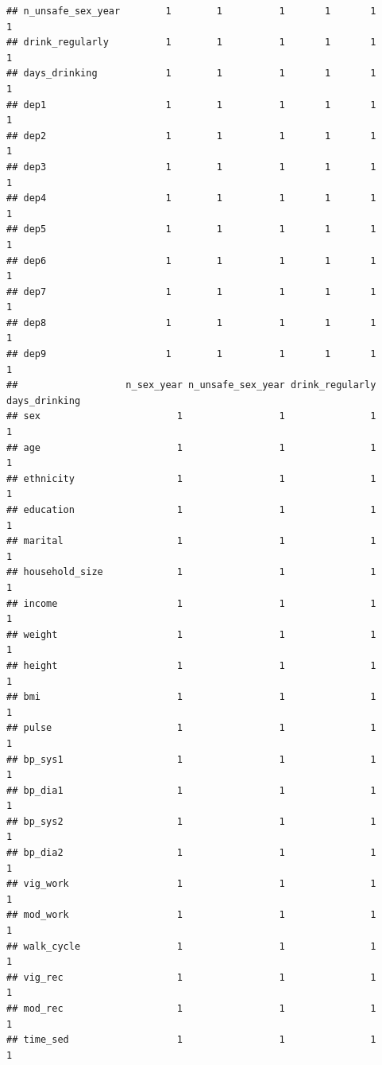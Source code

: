 \documentclass[
]{article}
\begin{document}
\begin{verbatim}
## n_unsafe_sex_year        1        1          1       1       1        1
## drink_regularly          1        1          1       1       1        1
## days_drinking            1        1          1       1       1        1
## dep1                     1        1          1       1       1        1
## dep2                     1        1          1       1       1        1
## dep3                     1        1          1       1       1        1
## dep4                     1        1          1       1       1        1
## dep5                     1        1          1       1       1        1
## dep6                     1        1          1       1       1        1
## dep7                     1        1          1       1       1        1
## dep8                     1        1          1       1       1        1
## dep9                     1        1          1       1       1        1
##                   n_sex_year n_unsafe_sex_year drink_regularly days_drinking
## sex                        1                 1               1             1
## age                        1                 1               1             1
## ethnicity                  1                 1               1             1
## education                  1                 1               1             1
## marital                    1                 1               1             1
## household_size             1                 1               1             1
## income                     1                 1               1             1
## weight                     1                 1               1             1
## height                     1                 1               1             1
## bmi                        1                 1               1             1
## pulse                      1                 1               1             1
## bp_sys1                    1                 1               1             1
## bp_dia1                    1                 1               1             1
## bp_sys2                    1                 1               1             1
## bp_dia2                    1                 1               1             1
## vig_work                   1                 1               1             1
## mod_work                   1                 1               1             1
## walk_cycle                 1                 1               1             1
## vig_rec                    1                 1               1             1
## mod_rec                    1                 1               1             1
## time_sed                   1                 1               1             1

\end{verbatim}
\end{document}
